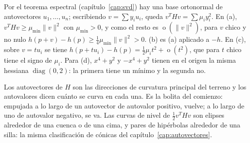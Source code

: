 \begin{demostracion}
Por el teorema espectral (capítulo~\ref{cap:svd}) hay una base ortonormal de autovectores
\(u_1,\ldots,u_n\); escribiendo \(v=\sum y_iu_i\), queda \(v^THv=\sum\mu_iy_i^2\). En (a),
\(v^THv\ge\mu_{\min}\lVert v\rVert^2\) con \(\mu_{\min}>0\), y como el resto es
\(\operatorname{o}(\lVert v\rVert^2)\), para \(v\) chico y no nulo
\(h(p+v)-h(p)\ge\tfrac14\mu_{\min}\lVert v\rVert^2>0\). (b) es (a) aplicado a \(-h\). En
(c), sobre \(v=tu_i\) se tiene \(h(p+tu_i)-h(p)=\tfrac12\mu_it^2+\operatorname{o}(t^2)\),
que para \(t\) chico tiene el signo de \(\mu_i\). Para (d), \(x^4+y^2\) y \(-x^4+y^2\)
tienen en el origen la misma hessiana \(\operatorname{diag}(0,2)\): la primera tiene un mínimo y
la segunda no.
\end{demostracion}

Los autovectores de \(H\) son las direcciones de curvatura principal del terreno y los
autovalores dicen cuánto se curva en cada una. Es la bolita del comienzo: empujada a lo largo de
un autovector de autovalor positivo, vuelve; a lo largo de uno de autovalor negativo, se va.
Las curvas de nivel de \(\tfrac12v^THv\) son
elipses alrededor de una cuenca o de una cima, y pares de hipérbolas alrededor de una silla: la
misma clasificación de cónicas del capítulo~\ref{cap:autovectores}.

